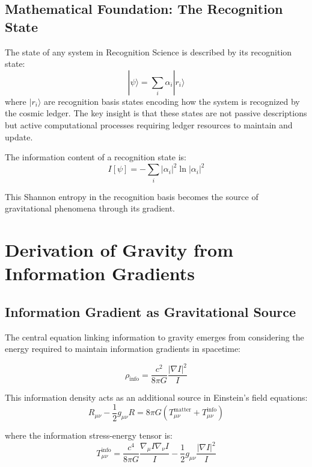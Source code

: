 \documentclass[12pt]{article}
\begin{document}
\subsection{Mathematical Foundation: The Recognition State}

The state of any system in Recognition Science is described by its recognition state:
\begin{equation}
|\psi\rangle = \sum_i \alpha_i |r_i\rangle
\end{equation}
where $|r_i\rangle$ are recognition basis states encoding how the system is recognized by the cosmic ledger. The key insight is that these states are not passive descriptions but active computational processes requiring ledger resources to maintain and update.

The information content of a recognition state is:
\begin{equation}
I[\psi] = -\sum_i |\alpha_i|^2 \ln |\alpha_i|^2
\end{equation}

This Shannon entropy in the recognition basis becomes the source of gravitational phenomena through its gradient.

\section{Derivation of Gravity from Information Gradients}

\subsection{Information Gradient as Gravitational Source}

The central equation linking information to gravity emerges from considering the energy required to maintain information gradients in spacetime:

\begin{equation}
\rho_{\text{info}} = \frac{c^2}{8\pi G} \frac{|\nabla I|^2}{I}
\end{equation}

This information density acts as an additional source in Einstein's field equations:
\begin{equation}
R_{\mu\nu} - \frac{1}{2}g_{\mu\nu}R = 8\pi G \left(T_{\mu\nu}^{\text{matter}} + T_{\mu\nu}^{\text{info}}\right)
\end{equation}

where the information stress-energy tensor is:
\begin{equation}
T_{\mu\nu}^{\text{info}} = \frac{c^4}{8\pi G} \frac{\nabla_\mu I \nabla_\nu I}{I} - \frac{1}{2}g_{\mu\nu} \frac{|\nabla I|^2}{I}
\end{equation}
\end{document}

